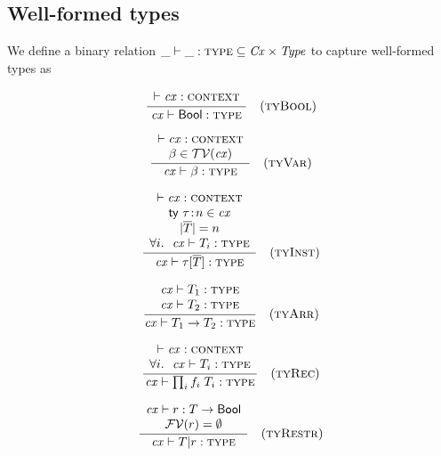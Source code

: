 \subsection{Well-formed types}

We define a binary relation $\binrel{\istyY}{\Cx}{\Typ}$ to capture
well-formed types as

\[
\rruleI
 {\cxwfO}
 {\istyO{\bool}}
 {\Rtbool}
\]

\[
\rruleII
 {\cxwfO}
 {\tvar\in\cxtvarO}
 {\istyO{\tvar}}
 {\Rtvar}
\]

\[
\rruleIV
 {\cxwfO}
 {\tdecO\in\cx}
 {\seqlen{\typS}=n}
 {\FORALL{i}{\istyO{\typ_i}}}
 {\istyO{\tinstO}}
 {\Rtinst}
\]

\[
\rruleII
 {\istyO{\typ_1}}
 {\istyO{\typ_2}}
 {\istyO{\tarrO}}
 {\Rtarr}
\]

\[
\rruleII
 {\cxwfO}
 {\FORALL{i}{\istyO{\typ_i}}}
 {\istyO{\trecO}}
 {\Rtrec}
\]


\[
\rruleII
 {\hastyO{\tspred}{\tarr{\typ}{\bool}}}
 {\efvar{\tspred}=\emptyset}
 {\istyO{\tsubO}}
 {\Rtsub}
\]


